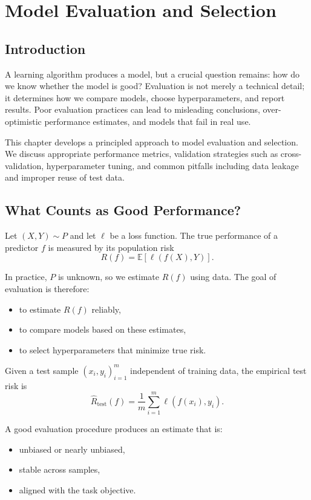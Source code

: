 \chapter{Model Evaluation and Selection}

\section{Introduction}

A learning algorithm produces a model, but a crucial question remains: how do we know whether the model is good? Evaluation is not merely a technical detail; it determines how we compare models, choose hyperparameters, and report results. Poor evaluation practices can lead to misleading conclusions, over-optimistic performance estimates, and models that fail in real use.

This chapter develops a principled approach to model evaluation and selection. We discuss appropriate performance metrics, validation strategies such as cross-validation, hyperparameter tuning, and common pitfalls including data leakage and improper reuse of test data.

\section{What Counts as Good Performance?}

Let $(X,Y)\sim P$ and let $\ell$ be a loss function. The true performance of a predictor $f$ is measured by its population risk
\[
R(f)=\mathbb{E}[\ell(f(X),Y)].
\]

In practice, $P$ is unknown, so we estimate $R(f)$ using data. The goal of evaluation is therefore:
\begin{itemize}
    \item to estimate $R(f)$ reliably,
    \item to compare models based on these estimates,
    \item to select hyperparameters that minimize true risk.
\end{itemize}

\begin{definition}
Given a test sample $(x_i,y_i)_{i=1}^m$ independent of training data, the empirical test risk is
\[
\widehat R_{\mathrm{test}}(f)=\frac1m\sum_{i=1}^m \ell(f(x_i),y_i).
\]
\end{definition}

A good evaluation procedure produces an estimate that is:
\begin{itemize}
    \item unbiased or nearly unbiased,
    \item stable across samples,
    \item aligned with the task objective.
\end{itemize}


